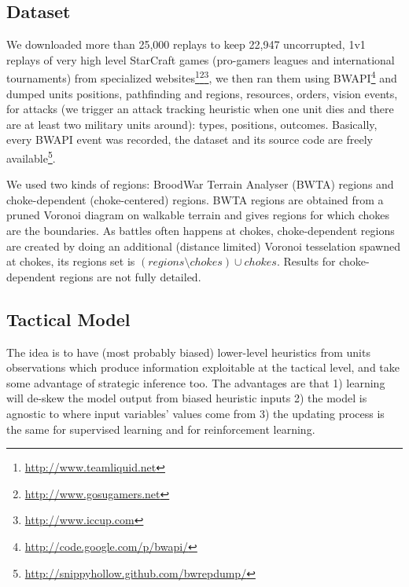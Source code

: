 \subsection{Dataset}
We downloaded more than 25,000 replays to keep 22,947 uncorrupted, 1v1 replays of very high level StarCraft games (pro-gamers leagues and international tournaments) from specialized websites\footnote{\url{http://www.teamliquid.net}}\footnote{\url{http://www.gosugamers.net}}\footnote{\url{http://www.iccup.com}}, we then ran them using BWAPI\footnote{\url{http://code.google.com/p/bwapi/}} and dumped units positions, pathfinding and regions, resources, orders, vision events, for attacks (we trigger an attack tracking heuristic when one unit dies and there are at least two military units around): types, positions, outcomes. Basically, every BWAPI event was recorded, the dataset and its source code are freely available\footnote{\url{http://snippyhollow.github.com/bwrepdump/}}. 

We used two kinds of regions: BroodWar Terrain Analyser (BWTA) regions and choke-dependent (choke-centered) regions. BWTA regions are obtained from a pruned Voronoi diagram on walkable terrain \cite{Perkins2010} and gives regions for which chokes are the boundaries. As battles often happens at chokes, choke-dependent regions are created by doing an additional (distance limited) Voronoi tesselation spawned at chokes, its regions set is $(regions \setminus chokes) \cup chokes$. Results for choke-dependent regions are not fully detailed.

\subsection{Tactical Model}
The idea is to have (most probably biased) lower-level heuristics from units observations which produce information exploitable at the tactical level, and take some advantage of strategic inference too. The advantages are that 1) learning will de-skew the model output from biased heuristic inputs 2) the model is agnostic to where input variables' values come from 3) the updating process is the same for supervised learning and for reinforcement learning. 

